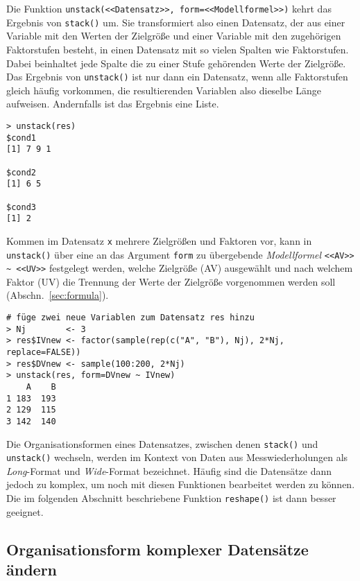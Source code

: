 Die Funktion \lstinline!unstack(<<Datensatz>>, form=<<Modellformel>>)! kehrt das Ergebnis von \lstinline!stack()! um. Sie transformiert also einen Datensatz, der aus einer Variable mit den Werten der Zielgröße und einer Variable mit den zugehörigen Faktorstufen besteht, in einen Datensatz mit so vielen Spalten wie Faktorstufen. Dabei beinhaltet jede Spalte die zu einer Stufe gehörenden Werte der Zielgröße. Das Ergebnis von \lstinline!unstack()! ist nur dann ein Datensatz, wenn alle Faktorstufen gleich häufig vorkommen, die resultierenden Variablen also dieselbe Länge aufweisen. Andernfalls ist das Ergebnis eine Liste.
\begin{lstlisting}
> unstack(res)
$cond1
[1] 7 9 1

$cond2
[1] 6 5

$cond3
[1] 2
\end{lstlisting}

Kommen im Datensatz \lstinline!x! mehrere Zielgrößen und Faktoren vor, kann in \lstinline!unstack()! über eine an das Argument \lstinline!form! zu übergebende \emph{Modellformel} \lstinline!<<AV>> ~ <<UV>>! festgelegt werden, welche Zielgröße (AV) ausgewählt und nach welchem Faktor (UV) die Trennung der Werte der Zielgröße vorgenommen werden soll (Abschn.\ \ref{sec:formula}).
\begin{lstlisting}
# füge zwei neue Variablen zum Datensatz res hinzu
> Nj        <- 3
> res$IVnew <- factor(sample(rep(c("A", "B"), Nj), 2*Nj, replace=FALSE))
> res$DVnew <- sample(100:200, 2*Nj)
> unstack(res, form=DVnew ~ IVnew)
    A    B
1 183  193
2 129  115
3 142  140
\end{lstlisting}

Die Organisationsformen eines Datensatzes, zwischen denen \lstinline!stack()! und \lstinline!unstack()! wechseln, werden im Kontext von Daten aus Messwiederholungen als \emph{Long}-Format und \emph{Wide}-Format bezeichnet. Häufig sind die Datensätze dann jedoch zu komplex, um noch mit diesen Funktionen bearbeitet werden zu können. Die im folgenden Abschnitt beschriebene Funktion \lstinline!reshape()! ist dann besser geeignet.

\subsection{Organisationsform komplexer Datensätze ändern}
\label{sec:reshape}

